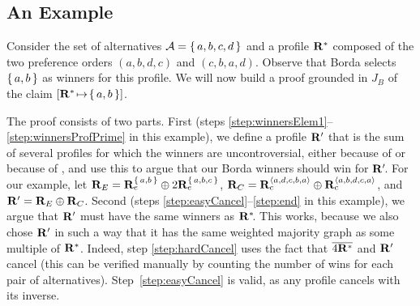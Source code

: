 \documentclass{comsoc2016}
\begin{document}
\subsection{An Example}
\label{sec:BordaExample}
Consider the set of alternatives $\mathcal{A}=\set{a, b, c, d}$ and a profile $\mathbf{R}^*$ composed of the two preference orders $(a, b, d, c)$ and $(c, b, a, d)$.
Observe that Borda selects $\set{a, b}$ as winners for this profile. We will now build a proof grounded in $J_B$ of the claim $\lato[\tprof][\set{a, b}]$.

The proof consists of two parts. First (steps \ref{step:winnersElem1}--\ref{step:winnersProfPrime} in this example), we define a profile $\mathbf{R}'$ that is the sum of several profiles for which the winners are uncontroversial, either because of  or because of , and use this to argue that our Borda winners should win for $\mathbf{R}'\!$. For our example, let $\mathbf{R}_E = \mathbf{R}^{\set{a, b}}_e \oplus 2 \mathbf{R}^{\set{a, b, c}}_e$, $\mathbf{R}_C = \mathbf{R}^{\left<a, d, c, b, a\right>}_c \oplus \mathbf{R}^{\left<a, b, d, c, a\right>}_c$, and $\mathbf{R}' = \mathbf{R}_E \oplus \mathbf{R}_C$. Second (steps \ref{step:easyCancel}--\ref{step:end} in this example), we argue that $\mathbf{R}'$ must have the same winners as $\mathbf{R}^*\!$. This works, because we also chose $\mathbf{R}'$ in such a way that it has the same weighted majority graph as some multiple of $\mathbf{R}^*$. Indeed, step \ref{step:hardCancel} uses the fact that $\overline{4 \mathbf{R}^*}$ and $\mathbf{R}'$ cancel (this can be verified manually by counting the number of wins for each pair of alternatives). Step~\ref{step:easyCancel} is valid, as any profile cancels with its inverse.
\end{document}
